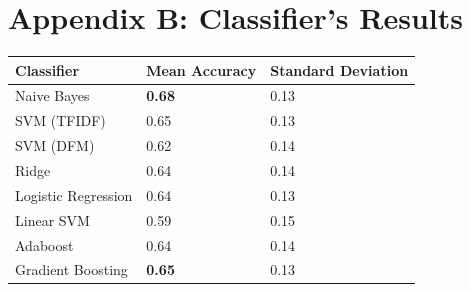 \documentclass[12pt]{article}
\begin{document}
\section*{Appendix B: Classifier's Results}
\label{appb}

\centering
\label{my-label}
\begin{tabular}{|l|l|l|}
\hline
Classifier          & Mean Accuracy & Standard Deviation \\ \hline \hline
Naive Bayes         & \textbf{0.68}          & 0.13               \\ \hline
SVM (TFIDF)         & 0.65          & 0.13               \\ \hline
SVM (DFM)           & 0.62          & 0.14               \\ \hline
Ridge               & 0.64          & 0.14               \\ \hline
Logistic Regression & 0.64          & 0.13               \\ \hline
Linear SVM          & 0.59          & 0.15               \\ \hline
Adaboost            & 0.64          & 0.14               \\ \hline
Gradient Boosting   & \textbf{0.65}          & 0.13               \\ \hline
\end{tabular}


\end{document}
